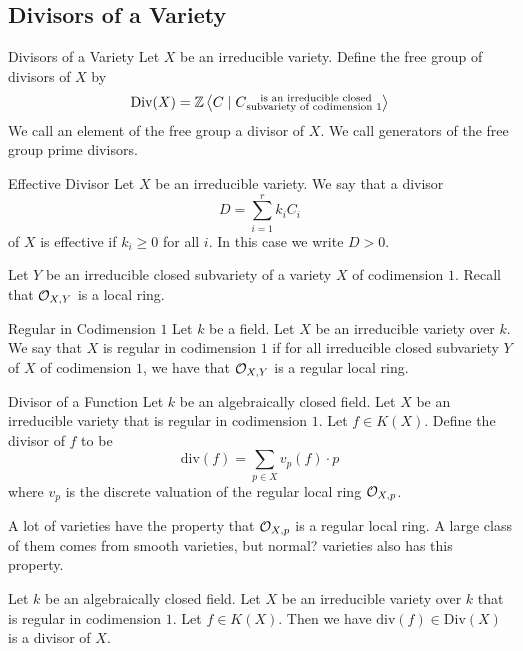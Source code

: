 \documentclass[a4paper]{article}
\begin{document}
\subsection{Divisors of a Variety}
\begin{defn}{Divisors of a Variety}{} Let $X$ be an irreducible variety. Define the free group of divisors of $X$ by $$\text{Div}(X)=\mathbb{Z}\left\langle C\;|\;C\substack{\text{ is an irreducible closed}\\\text{subvariety of codimension }1}\right\rangle$$ We call an element of the free group a divisor of $X$. We call generators of the free group prime divisors. 
\end{defn}

\begin{defn}{Effective Divisor}{} Let $X$ be an irreducible variety. We say that a divisor $$D=\sum_{i=1}^rk_iC_i$$ of $X$ is effective if $k_i\geq 0$ for all $i$. In this case we write $D>0$. 
\end{defn}

Let $Y$ be an irreducible closed subvariety of a variety $X$ of codimension $1$. Recall that $\mathcal{O}_{X,Y}$ is a local ring. 

\begin{defn}{Regular in Codimension $1$}{} Let $k$ be a field. Let $X$ be an irreducible variety over $k$. We say that $X$ is regular in codimension $1$ if for all irreducible closed subvariety $Y$ of $X$ of codimension $1$, we have that $\mathcal{O}_{X,Y}$ is a regular local ring. 
\end{defn}

\begin{defn}{Divisor of a Function}{} Let $k$ be an algebraically closed field. Let $X$ be an irreducible variety that is regular in codimension $1$. Let $f\in K(X)$. Define the divisor of $f$ to be $$\text{div}(f)=\sum_{p\in X}v_p(f)\cdot p$$ where $v_p$ is the discrete valuation of the regular local ring $\mathcal{O}_{X,p}$. 
\end{defn}

A lot of varieties have the property that $\mathcal{O}_{X,p}$ is a regular local ring. A large class of them comes from smooth varieties, but normal? varieties also has this property. 

\begin{lmm}{}{} Let $k$ be an algebraically closed field. Let $X$ be an irreducible variety over $k$ that is regular in codimension $1$. Let $f\in K(X)$. Then we have $\text{div}(f)\in\text{Div}(X)$ is a divisor of $X$. 
\end{lmm}
\end{document}
